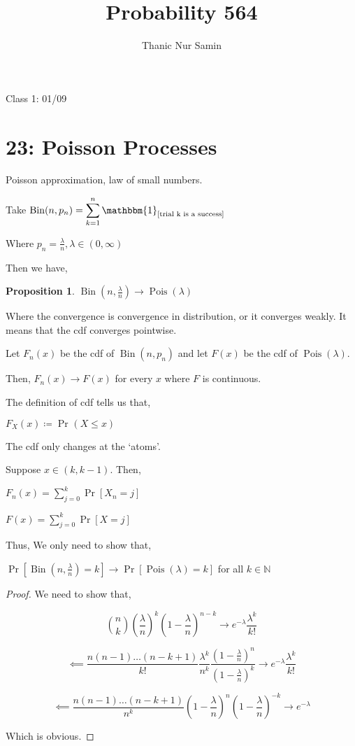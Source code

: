 \documentclass{article}
\title{Probability 564}
\author{Thanic Nur Samin}
\date{\vspace{-5ex}}
\theoremstyle{definition}
\newtheorem{proposition}{Proposition}
\newcommand{\Bin}{\operatorname{Bin}}
\newcommand{\Pois}{\operatorname{Pois}}
\begin{document}
\maketitle

Class 1: 01/09

\section*{23: Poisson Processes}

Poisson approximation, law of small numbers.

Take \(\Bin(n,p_{n})=\displaystyle \sum_{k=1}^{n} \mathbbm{1}_{[\text{trial k is a success} ]} \)

Where \(p_{n} =\frac{\lambda}{n},\lambda \in (0,\infty)\) 

Then we have,

\begin{proposition}
    \(\Bin(n,\frac{\lambda}{n}) \to \Pois(\lambda)\)    
\end{proposition}

Where the convergence is convergence in distribution, or it converges weakly. It means that the cdf converges pointwise.

Let \(F_n(x)\) be the cdf of \(\Bin(n,p_{n})\) and let \(F(x)\) be the cdf of \(\Pois(\lambda)\).

Then, \(F_n(x)\to F(x)\) for every \(x\) where \(F\) is continuous.

The definition of cdf tells us that,

\(F_{X} (x)\coloneqq \Pr_{}(X\leq x) \) 

The cdf only changes at the `atoms'.

Suppose \(x\in (k,k-1)\). Then,

\(F_{n} (x)=\displaystyle \sum_{j=0}^{k} \Pr[X_{n} =j]\) 

\(F(x)=\displaystyle \sum_{j=0}^{k} \Pr[X=j]\)  

Thus, We only need to show that,

\(\Pr[\Bin(n,\frac{\lambda}{n})=k]\to \Pr[\Pois(\lambda)=k]\) for all \(k\in \mathbb{N}\)  

\begin{proof}
    We need to show that,

    \[
        \binom{n}{k} \left( \frac{\lambda}{n} \right)^k \left( 1-\frac{\lambda}{n} \right)^{n-k}  \to e^{-\lambda}\frac{\lambda^k}{k!}
    \]

    \[
        \impliedby \frac{n(n-1)\dots (n-k+1)}{k!}\frac{\lambda^k}{n^k}\frac{(1-\frac{\lambda}{n})^n}{(1-\frac{\lambda}{n})^k} \to e^{-\lambda}\frac{\lambda^k}{k!} 
    \]

    \[
        \impliedby \frac{n(n-1)\dots (n-k+1)}{n^k}\left(1-\frac{\lambda}{n}\right)^n \left(1-\frac{\lambda}{n}\right)^{-k} \to e^{-\lambda} 
    \]

    Which is obvious.

\end{proof}
\end{document}
